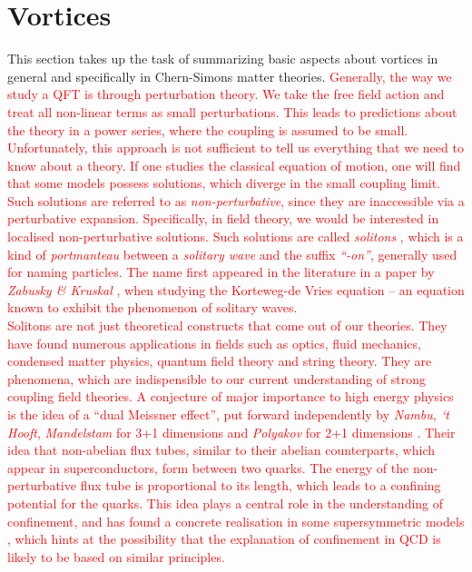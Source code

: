         \section{Vortices} \label{vortices_sec}
This section takes up the task of summarizing basic aspects about vortices in general and specifically in Chern-Simons matter theories.
       \textcolor{red}{ Generally, the way we study a QFT is through perturbation theory. We take the free field action and treat all non-linear terms as small perturbations. This leads to predictions about the theory in a power series, where the coupling is assumed to be small. Unfortunately, this approach is not sufficient to tell us everything that we need to know about a theory. If one studies the classical equation of motion, one will find that some models possess solutions, which diverge in the small coupling limit. Such solutions are referred to as \textit{non-perturbative}, since they are inaccessible via a perturbative expansion. Specifically, in field theory, we would be interested in localised non-perturbative solutions. Such solutions are called \textit{solitons} , which is a kind of \textit{portmanteau} between a \textit{solitary wave} and the suffix \textit{``-on''}, generally used for naming particles. The name first appeared in the literature in a paper by \textit{Zabusky \& Kruskal} \cite{PhysRevLett.15.240}, when studying the Korteweg-de Vries equation -- an equation known to exhibit the phenomenon of solitary waves. }\\
       \indent \textcolor{red}{Solitons are not just theoretical constructs that come out of our theories. They have found numerous applications in fields such as optics, fluid mechanics, condensed matter physics, quantum field theory and string theory. They are phenomena, which are indispensible to our current understanding of strong coupling field theories. A conjecture of major importance to high energy physics is the idea of a ``dual Meissner effect'', put forward independently by \textit{Nambu, `t Hooft}, \textit{Mandelstam} for 3+1 dimensions and  \textit{Polyakov} for 2+1 dimensions \cite{Mandelstam:1974pi, tHooft:1974kcl, PhysRevD.10.4262, Polyakov1977}. Their idea that non-abelian flux tubes, similar to their abelian counterparts, which appear in superconductors, form between two quarks. The energy of the non-perturbative flux tube is proportional to its length, which leads to a confining potential for the quarks. This idea plays a central role in the understanding of confinement, and has found a concrete realisation in some supersymmetric models \cite{Seiberg1994, Seiberg:1994rs}, which hints at the possibility that the explanation of confinement in QCD is likely to be based on similar principles.  }

